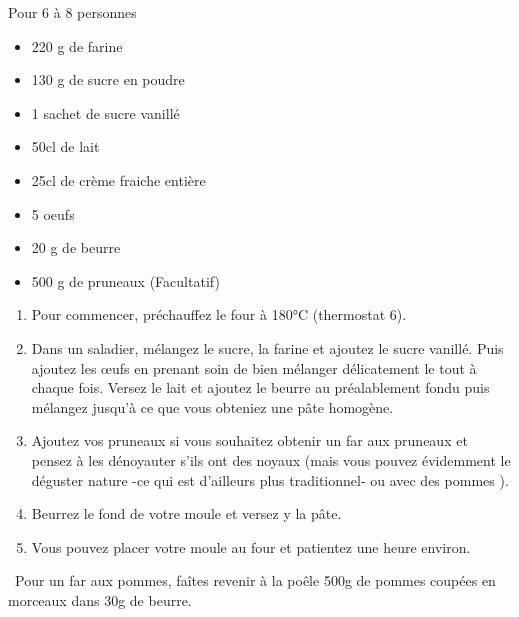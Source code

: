\medskip
{}
{Pour 6 à 8 personnes}{\begin{itemize}
\item 220 g de farine
\item 130 g de sucre en poudre
\item 1 sachet de sucre vanillé
\item 50cl de lait
\item 25cl de crème fraiche entière
\item 5 oeufs
\item 20 g de beurre
\item 500 g de pruneaux (Facultatif)
\end{itemize}}
{\begin{enumerate}
\item Pour commencer, préchauffez le four à 180°C (thermostat 6).
\item Dans un saladier, mélangez le sucre, la farine et ajoutez le sucre vanillé. Puis ajoutez les œufs en prenant soin de bien mélanger délicatement le tout à chaque fois. Versez le lait et ajoutez le beurre au préalablement fondu puis mélangez jusqu'à ce que vous obteniez une pâte homogène.
\item Ajoutez vos pruneaux si vous souhaitez obtenir un far aux pruneaux et pensez à les dénoyauter s'ils ont des noyaux (mais vous pouvez évidemment le déguster nature -ce qui est d'ailleurs plus traditionnel- ou avec des pommes \bcinfo).
\item Beurrez le fond de votre moule et versez y la pâte.
\item Vous pouvez placer votre moule au four et patientez une heure environ.
\end{enumerate}
\bcinfo\ Pour un far aux pommes, faîtes revenir à la poêle 500g de pommes coupées en morceaux dans 30g de beurre.}

